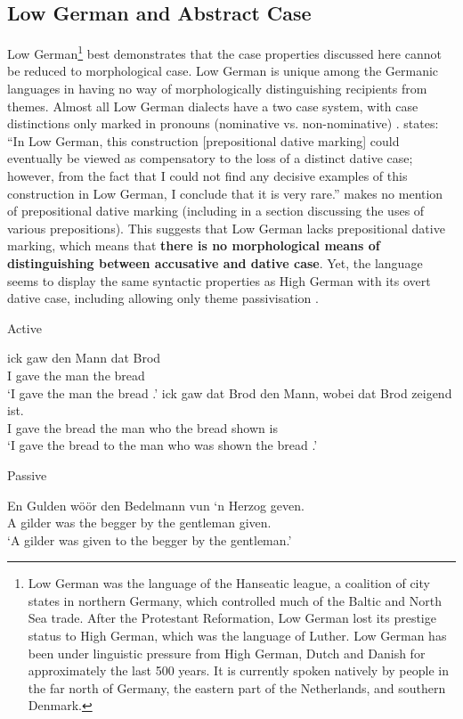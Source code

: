 \subsection{Low German and Abstract Case}
Low German\footnote{Low German was the language of the Hanseatic league, a coalition of city states in northern Germany, which controlled much of the Baltic and North Sea trade. After the Protestant Reformation, Low German lost its prestige status to High German, which was the language of Luther. Low German has been under linguistic pressure from High German, Dutch and Danish for approximately the last 500 years. It is currently spoken natively by people in the far north of Germany, the eastern part of the Netherlands, and southern Denmark.} best demonstrates that the case properties discussed here cannot be reduced to morphological case. Low German is unique among the Germanic languages in having no way of morphologically distinguishing recipients from themes. Almost all Low German dialects have a two case system, with case distinctions only marked in pronouns (nominative vs. non-nominative) \citep{Shrier.1965,Lindow.1998}. \cite{Fleischer.2006} states: ``In Low German, this construction [prepositional dative marking] could eventually be viewed as compensatory to the loss of a distinct dative case; however, from the fact that I could not find any decisive examples of this construction in Low German, I conclude that it is very rare.'' \cite{Lindow.1998} makes no mention of prepositional dative marking (including in a section discussing the uses of various prepositions). This suggests that Low German lacks prepositional dative marking, which means that \textbf{there is no morphological means of distinguishing between accusative and dative case}. Yet, the language seems to display the same syntactic properties as High German with its overt dative case, including allowing only theme passivisation \citep{Lindow.1998}. 
\begin{exe}
\ex Active
\begin{xlist}
\ex \gll ick gaw den Mann dat Brod\\
I gave the man the bread\\
\trans `I gave the man the bread \citep{Mussaus.1829}.'
\ex \gll ick gaw dat Brod den Mann, wobei dat Brod zeigend ist.\\
I gave the bread the man who the bread shown is\\
\trans `I gave the bread to the man who was shown the bread \citep{Mussaus.1829}.'
\end{xlist}
\ex Passive
\begin{xlist}
\ex \gll En Gulden w\"o\"or den Bedelmann vun `n Herzog geven.\\
A gilder was the begger by the gentleman given.\\
\trans `A gilder was given to the begger by the gentleman.'
\end{xlist}
\end{exe}

